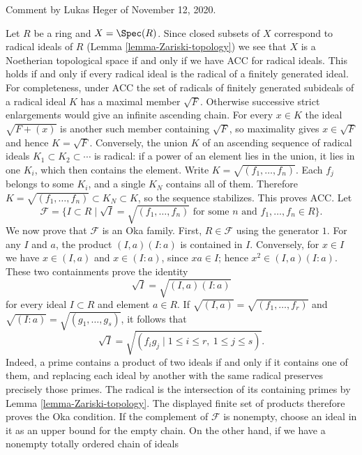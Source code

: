 \begin{example}
\label{example-noetherian-topology-on-spec}
\begin{reference}
Comment by Lukas Heger of November 12, 2020.
\end{reference}
Let $R$ be a ring and $X = \Spec(R)$. Since closed subsets of $X$ correspond to
radical ideals of $R$ (Lemma \ref{lemma-Zariski-topology}) we see that $X$ is a
Noetherian topological space if and only if we have ACC for radical ideals.
This holds if and only if every radical ideal is the radical of a finitely
generated ideal. For completeness, under ACC the set of radicals
of finitely generated subideals of a radical ideal $K$ has a maximal
member $\sqrt{F}$. Otherwise successive strict enlargements would
give an infinite ascending chain. For every $x\in K$ the ideal
$\sqrt{F+(x)}$ is another such member containing $\sqrt F$,
so maximality gives $x\in\sqrt F$ and hence $K=\sqrt F$.
Conversely, the union $K$ of an ascending sequence of radical ideals
$K_1\subset K_2\subset\cdots$ is radical: if a power of an element
lies in the union, it lies in one $K_i$, which then contains the element.
Write $K=\sqrt{(f_1,\ldots,f_n)}$. Each $f_j$ belongs to some
$K_i$, and a single $K_N$ contains all of them. Therefore
$K=\sqrt{(f_1,\ldots,f_n)}\subset K_N\subset K$, so the sequence
stabilizes. This proves ACC. Let
$$
\mathcal{F} = \{I \subset R \mid
\sqrt{I} = \sqrt{(f_1, \ldots, f_n)}\text{ for some }n
\text{ and }f_1, \ldots, f_n \in R\}.
$$
We now prove that $\mathcal F$ is an Oka family. First, $R\in\mathcal F$
using the generator $1$. For any $I$ and $a$, the product
$(I,a)(I:a)$ is contained in $I$. Conversely, for $x\in I$ we have
$x\in(I,a)$ and $x\in(I:a)$, since $xa\in I$; hence
$x^2\in(I,a)(I:a)$. These two containments prove the identity
$$
\sqrt{I} = \sqrt{(I, a)(I : a)}
$$
for every ideal $I\subset R$ and element $a\in R$.
If $\sqrt{(I,a)}=\sqrt{(f_1,\ldots,f_r)}$ and
$\sqrt{(I:a)}=\sqrt{(g_1,\ldots,g_s)}$, it follows that
$$
\sqrt I=\sqrt{(f_i g_j\mid 1\leq i\leq r,\ 1\leq j\leq s)}.
$$
Indeed, a prime contains a product of two ideals if and only if it
contains one of them, and replacing each ideal by another with the
same radical preserves precisely those primes. The radical is the
intersection of its containing primes by Lemma \ref{lemma-Zariski-topology}.
The displayed finite set of products therefore proves the Oka condition.
If the complement of $\mathcal F$ is nonempty, choose an ideal
in it as an upper bound for the empty chain. On the other hand,
if we have a nonempty totally ordered chain of ideals

\end{example}
